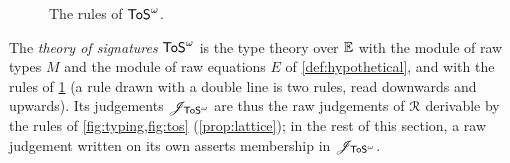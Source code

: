 \begin{figure}[tp]
    \centering
    \caption{The rules of $\mathsf{ToS}^\omega$.}
    \label{fig:tos}
\end{figure}

\begin{definition}\label{def:tos}
    The \emph{theory of signatures} $\mathsf{ToS}^\omega$ is the type theory over $\mathbb{E}$ with the module of raw types $M$ and the module of raw equations $E$ of \cref{def:hypothetical}, and with the rules of \cref{fig:tos} (a rule drawn with a double line is two rules, read downwards and upwards). Its judgements $\mathscr{J}_{\mathsf{ToS}^\omega}$ are thus the raw judgements of $\mathcal{R}$ derivable by the rules of \cref{fig:typing,fig:tos} (\cref{prop:lattice}); in the rest of this section, a raw judgement written on its own asserts membership in $\mathscr{J}_{\mathsf{ToS}^\omega}$.
\end{definition}

